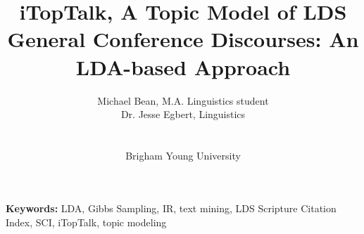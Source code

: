 \title{iTopTalk, A Topic Model of LDS General Conference Discourses: An LDA-based Approach}

\author{Michael Bean, M.A. Linguistics student\\
Dr. Jesse Egbert, Linguistics\\
\\
\\
Brigham Young University\\
}

\maketitle

{\bf Keywords:} LDA, Gibbs Sampling, IR, text mining, LDS Scripture Citation Index, SCI, iTopTalk, topic modeling
